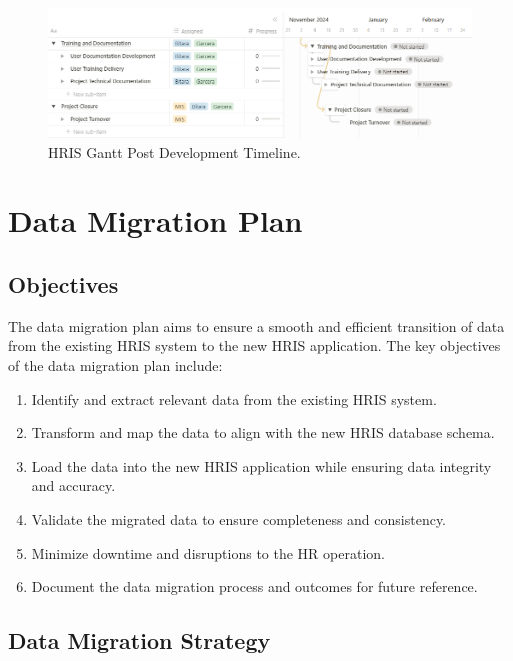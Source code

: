     \begin{figure}[H]
        \centering
        \includegraphics[width=1\linewidth]{figures/images/gantt-chart-4.png}
        \caption{HRIS Gantt Post Development Timeline.}
        \label{fig:gantt-chart-4}
    \end{figure}

\section{Data Migration Plan}

    \subsection{Objectives}

    The data migration plan aims to ensure a smooth and efficient transition of data from the existing HRIS system to the new HRIS application. The key objectives of the data migration plan include:

    \begin{enumerate}
        \item Identify and extract relevant data from the existing HRIS system.
        \item Transform and map the data to align with the new HRIS database schema.
        \item Load the data into the new HRIS application while ensuring data integrity and accuracy.
        \item Validate the migrated data to ensure completeness and consistency.
        \item Minimize downtime and disruptions to the HR operation.
        \item Document the data migration process and outcomes for future reference.
    \end{enumerate}

    \subsection{Data Migration Strategy}

